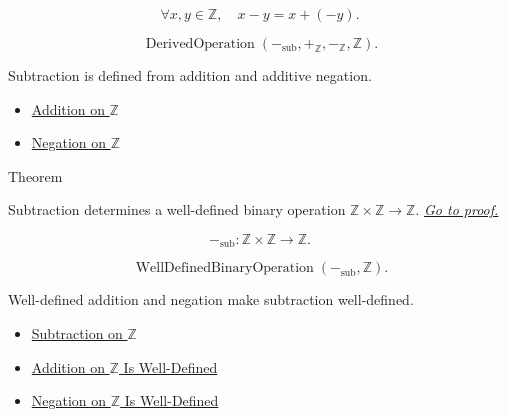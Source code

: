 \begin{remark*}
\[
\forall x,y\in\mathbb{Z},\quad x-y=x+(-y).
\]
\end{remark*}

\begin{remark*}
\[
\operatorname{DerivedOperation}(-_{\mathrm{sub}},+_{\mathbb{Z}},-_{\mathbb{Z}},\mathbb{Z}).
\]
\end{remark*}

\begin{remark*}[Interpretation]
Subtraction is defined from addition and additive negation.
\end{remark*}

\begin{dependencies}
\begin{itemize}
  \item \hyperref[def:addition-on-z-classes]{Addition on $\mathbb{Z}$}
  \item \hyperref[def:negation-on-z-classes]{Negation on $\mathbb{Z}$}
\end{itemize}
\end{dependencies}

\begin{theorembox}{Theorem}
\begin{theorem}
\label{thm:subtraction-on-z-well-defined}
Subtraction determines a well-defined binary operation
$\mathbb{Z}\times\mathbb{Z}\to\mathbb{Z}$.
\hyperref[prf:subtraction-on-z-well-defined]{\textit{Go to proof.}}
\end{theorem}
\end{theorembox}

\begin{remark*}
\[
-_{\mathrm{sub}}:\mathbb{Z}\times\mathbb{Z}\to\mathbb{Z}.
\]
\end{remark*}

\begin{remark*}
\[
\operatorname{WellDefinedBinaryOperation}(-_{\mathrm{sub}},\mathbb{Z}).
\]
\end{remark*}

\begin{remark*}[Interpretation]
Well-defined addition and negation make subtraction well-defined.
\end{remark*}

\begin{dependencies}
\begin{itemize}
  \item \hyperref[def:subtraction-on-z]{Subtraction on $\mathbb{Z}$}
  \item \hyperref[thm:addition-on-z-well-defined]{Addition on $\mathbb{Z}$ Is Well-Defined}
  \item \hyperref[thm:negation-on-z-well-defined]{Negation on $\mathbb{Z}$ Is Well-Defined}
\end{itemize}
\end{dependencies}

